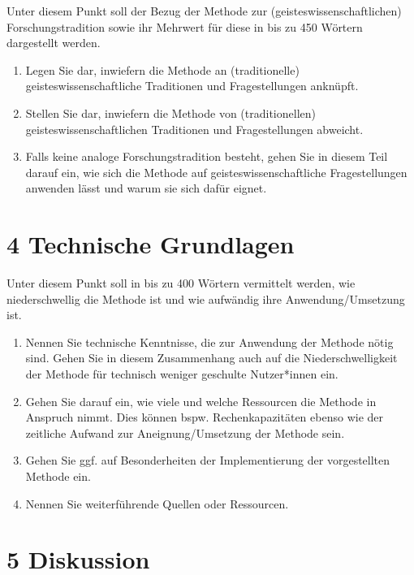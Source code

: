\documentclass[
          a4paper,
        ]{article}
\begin{document}
Unter diesem Punkt soll der Bezug der Methode zur
(geisteswissenschaftlichen) Forschungstradition sowie ihr Mehrwert für
diese in bis zu 450 Wörtern dargestellt werden.

\begin{enumerate}
\def\labelenumi{\alph{enumi}.}
\item
  Legen Sie dar, inwiefern die Methode an (traditionelle)
  geisteswissenschaftliche Traditionen und Fragestellungen anknüpft.
\item
  Stellen Sie dar, inwiefern die Methode von (traditionellen)
  geisteswissenschaftlichen Traditionen und Fragestellungen abweicht.
\item
  Falls keine analoge Forschungstradition besteht, gehen Sie in diesem
  Teil darauf ein, wie sich die Methode auf geisteswissenschaftliche
  Fragestellungen anwenden lässt und warum sie sich dafür eignet.
\end{enumerate}

\section{4 Technische Grundlagen}\label{technische-grundlagen}

Unter diesem Punkt soll in bis zu 400 Wörtern vermittelt werden, wie
niederschwellig die Methode ist und wie aufwändig ihre
Anwendung/Umsetzung ist.

\begin{enumerate}
\def\labelenumi{\alph{enumi}.}
\item
  Nennen Sie technische Kenntnisse, die zur Anwendung der Methode nötig
  sind. Gehen Sie in diesem Zusammenhang auch auf die
  Niederschwelligkeit der Methode für technisch weniger geschulte
  Nutzer*innen ein.
\item
  Gehen Sie darauf ein, wie viele und welche Ressourcen die Methode in
  Anspruch nimmt. Dies können bspw. Rechenkapazitäten ebenso wie der
  zeitliche Aufwand zur Aneignung/Umsetzung der Methode sein.
\item
  Gehen Sie ggf. auf Besonderheiten der Implementierung der
  vorgestellten Methode ein.
\item
  Nennen Sie weiterführende Quellen oder Ressourcen.
\end{enumerate}

\section{5 Diskussion}\label{diskussion}
\end{document}
